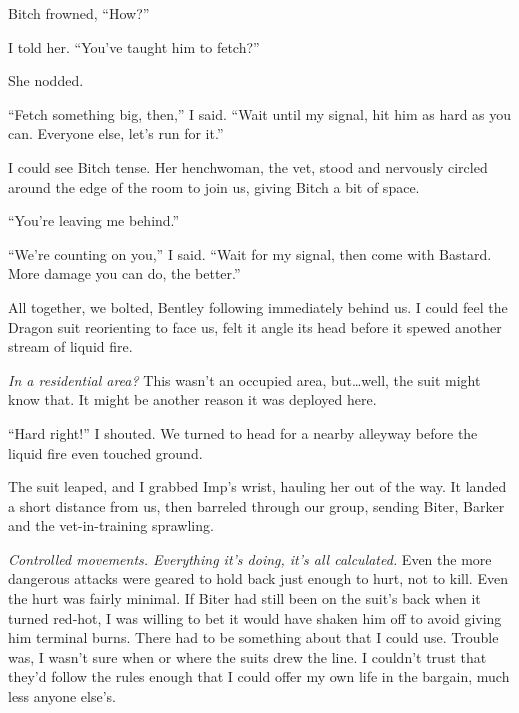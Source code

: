Bitch frowned, ``How?''



I told her.  ``You've taught him to fetch?''



She nodded.



``Fetch something big, then,'' I said.  ``Wait until my signal, hit him as hard as you can. Everyone else, let's run for it.''



I could see Bitch tense.  Her henchwoman, the vet, stood and nervously circled around the edge of the room to join us, giving Bitch a bit of space.



``You're leaving me behind.''



``We're counting on you,'' I said.  ``Wait for my signal, then come with Bastard.  More damage you can do, the better.''



All together, we bolted, Bentley following immediately behind us.  I could feel the Dragon suit reorienting to face us, felt it angle its head before it spewed another stream of liquid fire.



\emph{In a residential area?  }This wasn't an occupied area, but\ldots well, the suit might know that.  It might be another reason it was deployed here.



``Hard right!''  I shouted.  We turned to head for a nearby alleyway before the liquid fire even touched ground.



The suit leaped, and I grabbed Imp's wrist, hauling her out of the way.  It landed a short distance from us, then barreled through our group, sending Biter, Barker and the vet-in-training sprawling.



\emph{Controlled movements.  Everything it's doing, it's all calculated.  }Even the more dangerous attacks were geared to hold back just enough to hurt, not to kill.  Even the hurt was fairly minimal.  If Biter had still been on the suit's back when it turned red-hot, I was willing to bet it would have shaken him off to avoid giving him terminal burns.  There had to be something about that I could use.  Trouble was, I wasn't sure when or where the suits drew the line.  I couldn't trust that they'd follow the rules enough that I could offer my own life in the bargain, much less anyone else's.



